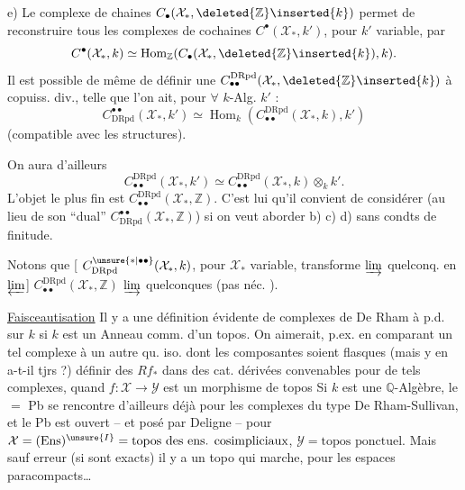 
e) Le complexe de chaines $C_\bullet(\mathcal X_*,\deleted{\mathbb Z}\inserted{k})$ permet de reconstruire tous les complexes de cochaines $C^\bullet(\mathcal X_*,k')$, pour $k'$  variable, par
\[
C^\bullet(\mathcal X_*,k)\simeq\operatorname{Hom}_{\mathbb Z}(C_\bullet(\mathcal X_*,\deleted{\mathbb Z}\inserted{k}),k).
\]
Il est possible de même de définir une   $C_{\bullet\bullet}^{\mathrm{DRpd}}(\mathcal X_*,\deleted{\mathbb Z}\inserted{k})$  à copuiss. div., telle que l'on ait, pour $\forall$ $k$-Alg. $k'$ :
\[
C^{\bullet\bullet}_{\mathrm{DRpd}}(\mathcal X_*,k')\simeq\operatorname{Hom}_k(C_{\bullet\bullet}^{\mathrm{DRpd}}(\mathcal X_*,k),k')
\]
(compatible avec  les structures).

On aura d'ailleurs
\[
C_{\bullet\bullet}^{\mathrm{DRpd}}(\mathcal X_*,k')\simeq C_{\bullet\bullet}^{\mathrm{DRpd}}(\mathcal X_*,k)\otimes_k k'.
\]
L'objet le plus fin est $C_{\bullet\bullet}^{\mathrm{DRpd}}(\mathcal X_*,\mathbb Z)$. C'est lui qu'il convient de considérer (au lieu de son ``dual'' $C^{\bullet\bullet}_{\mathrm{DRpd}}(\mathcal X_*,\mathbb Z)$) si on veut aborder b) c) d) sans condts de finitude.

Notons que [ $C^{\unsure{*|\bullet\bullet}}_{\mathrm{DRpd}}(\mathcal X_*,k)$, pour $\mathcal X_*$ variable, transforme $\varinjlim$ quelconq. en $\varprojlim$] $C_{\bullet\bullet}^{\mathrm{DRpd}}(\mathcal X_*,\mathbb Z)$   $\varinjlim$ quelconques (pas néc. ).


 \uline{Faisceautisation} Il y a une définition évidente de complexes de De Rham à p.d. sur $k$ si $k$ est un Anneau comm. d'un topos. On aimerait, p.ex. en comparant un tel complexe à un autre qu. iso. dont les composantes soient flasques (mais y en a-t-il tjrs ?) définir des  $Rf_*$ dans des cat. dérivées convenables pour de tels complexes, quand $f:\mathcal X\to\mathcal Y$ est un morphisme de topos  Si $k$ est une $\mathbb Q$-Algèbre, le $=$ Pb se rencontre d'ailleurs déjà pour les complexes du type De Rham-Sullivan, et le Pb est ouvert -- et posé par Deligne -- pour $\mathcal X=(\mathrm{Ens})^{\unsure{I}}=\text{topos des ens. cosimpliciaux}$, $\mathcal Y=\text{topos ponctuel}$. Mais sauf erreur (si  sont exacts) il y a un topo qui marche, pour les espaces  paracompacts\dots

